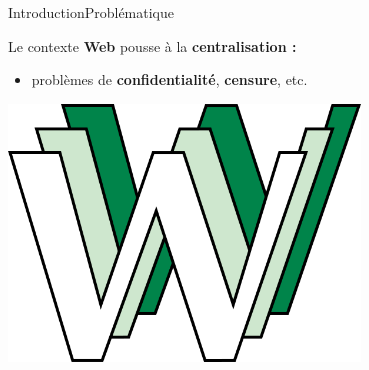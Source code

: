 \begin{frame}{Introduction}{Problématique}

  
  \begin{minipage}{0.69\textwidth}
    Le contexte \textbf{Web} pousse à la \textbf{centralisation :}
    \begin{itemize}
    \item problèmes de \textbf{confidentialité}, \textbf{censure}, etc.
    \end{itemize}
  \end{minipage}
  \hfill
  \begin{minipage}{0.3\textwidth}
    \includegraphics[width=0.7\textwidth]{img/www.png}
  \end{minipage}

  


\end{frame}
